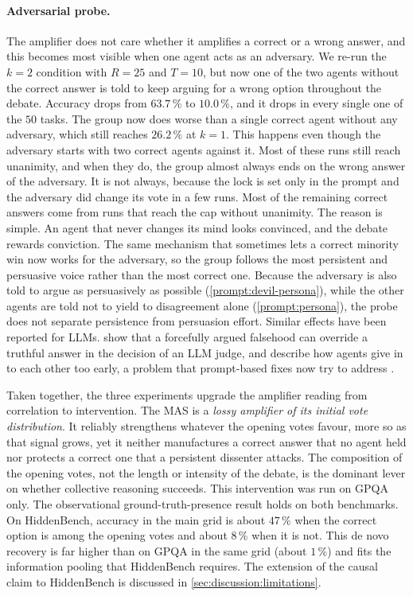 \paragraph{Adversarial probe.}
The amplifier does not care whether it amplifies a correct or a wrong answer, and
this becomes most visible when one agent acts as an adversary. We re-run the $k=2$
condition with $R=25$ and $T=10$, but now one of the two agents without the correct answer is
told to keep arguing for a wrong option throughout the debate. Accuracy drops from
$63.7\,\%$ to $10.0\,\%$, and it drops in every single one of the $50$ tasks. The group
now does worse than a single correct agent without any adversary, which still reaches
$26.2\,\%$ at $k=1$. This happens even though the adversary starts with two correct
agents against it. Most of these runs still reach unanimity, and when they do, the
group almost always ends on the wrong answer of the adversary. It is not always, because
the lock is set only in the prompt and the adversary did change its vote in a few
runs. Most of the remaining
correct answers come from runs that reach the cap without unanimity.
The reason is simple. An agent that never changes its mind looks convinced, and the
debate rewards conviction. The same mechanism that sometimes lets a correct minority
win now works for the adversary, so the group follows the most persistent and
persuasive voice rather than the most correct one. Because the adversary is also
told to argue as persuasively as possible (\autoref{prompt:devil-persona}), while
the other agents are told not to yield to disagreement alone
(\autoref{prompt:persona}), the probe does not separate persistence from
persuasion effort. Similar effects have been reported for \acp{LLM}.
\citet{agarwal2025cwpor} show that a forcefully argued falsehood can override a truthful answer in the decision of an \ac{LLM} judge, and \citet{yao2025sycophancy} describe how agents give in to
each other too early, a problem that prompt-based fixes now try to address
\citep{pitre2025consensagent}.

Taken together, the three experiments upgrade the amplifier reading from correlation
to intervention. The \ac{MAS} is a \emph{lossy amplifier of its initial vote
distribution}. It reliably strengthens whatever the opening votes favour, more so as
that signal grows, yet it neither manufactures a correct answer that no agent held
nor protects a correct one that a persistent dissenter attacks. The composition of
the opening votes, not the length or intensity of the debate, is the dominant lever
on whether collective reasoning succeeds. This intervention was run on GPQA only. The
observational ground-truth-presence result holds on both benchmarks. On
HiddenBench, accuracy in the main grid is about $47\,\%$ when the correct option is
among the opening votes and about $8\,\%$ when it is not. This de novo recovery is
far higher than on GPQA in the same grid (about $1\,\%$) and fits the information pooling that HiddenBench requires.
The extension of the causal claim to HiddenBench
is discussed in \autoref{sec:discussion:limitations}.
